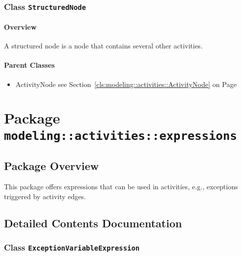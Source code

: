 \subsubsection{\Large{Class \bfseries \texttt{StructuredNode}\normalfont}}
\label{cls:modeling::activities::StructuredNode} 
\paragraph{Overview}

	
			
A structured node is a node that contains several other activities.	
		
	



\paragraph{Parent Classes}
\begin{itemize}
\item ActivityNode see Section~\ref{cls:modeling::activities::ActivityNode} on Page~\pageref{cls:modeling::activities::ActivityNode}\end{itemize}
\newpage
		


\section{Package \bfseries \texttt{modeling::activities::expressions}\normalfont}
\subsection{Package Overview}
	
			
This package offers expressions that can be used in activities, e.g., exceptions triggered by activity edges.	
		
	
			
		



\subsection{Detailed Contents Documentation}
\subsubsection{\Large{Class \bfseries \texttt{ExceptionVariableExpression}\normalfont}}
\label{cls:modeling::activities::expressions::ExceptionVariableExpression} 

